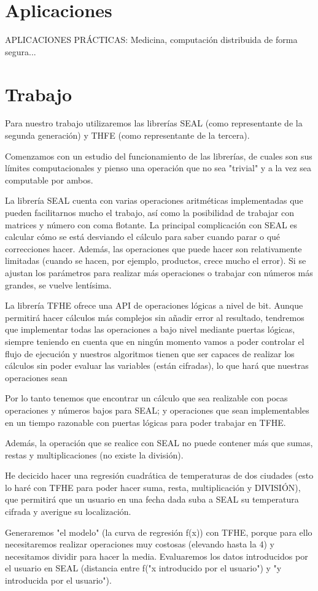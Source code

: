 \section{Aplicaciones}

APLICACIONES PRÁCTICAS: Medicina, computación distribuida de forma segura...

\section{Trabajo}

Para nuestro trabajo utilizaremos las librerías SEAL (como representante de la segunda generación) y THFE (como representante de la tercera).

Comenzamos con un estudio del funcionamiento de las librerías, de cuales son sus límites computacionales y pienso una operación que no sea "trivial" y a la vez sea computable por ambos.

La librería SEAL cuenta con varias operaciones aritméticas implementadas que pueden facilitarnos mucho el trabajo, así como la posibilidad de trabajar con matrices y número con coma flotante. La principal complicación con SEAL es calcular cómo se está desviando el cálculo para saber cuando parar o qué correcciones hacer. Además, las operaciones que puede hacer son relativamente limitadas (cuando se hacen, por ejemplo, productos, crece mucho el error). Si se ajustan los parámetros para realizar más operaciones o trabajar con números más grandes, se vuelve lentísima.

La librería TFHE ofrece una API de operaciones lógicas a nivel de bit. Aunque permitirá hacer cálculos más complejos sin añadir error al resultado, tendremos que implementar todas las operaciones a bajo nivel mediante puertas lógicas, siempre teniendo en cuenta que en ningún momento vamos a poder controlar el flujo de ejecución y nuestros algoritmos tienen que ser capaces de realizar los cálculos sin poder evaluar las variables (están cifradas), lo que hará que nuestras operaciones sean

Por lo tanto tenemos que encontrar un cálculo que sea realizable con pocas operaciones y números bajos para SEAL; y operaciones que sean implementables en un tiempo razonable con puertas lógicas para poder trabajar en TFHE.

Además, la operación que se realice con SEAL no puede contener más que sumas, restas y multiplicaciones (no existe la división).

He decicido hacer una regresión cuadrática de temperaturas de dos ciudades (esto lo haré con TFHE para poder hacer suma, resta, multiplicación y DIVISIÓN), que permitirá que un usuario en una fecha dada suba a SEAL su temperatura cifrada y averigue su localización.

Generaremos "el modelo" (la curva de regresión f(x)) con TFHE, porque para ello necesitaremos realizar operaciones muy costosas (elevando hasta la 4) y necesitamos dividir para hacer la media. Evaluaremos los datos introducidos por el usuario en SEAL (distancia entre f("x introducido por el usuario") y "y introducida por el usuario").
